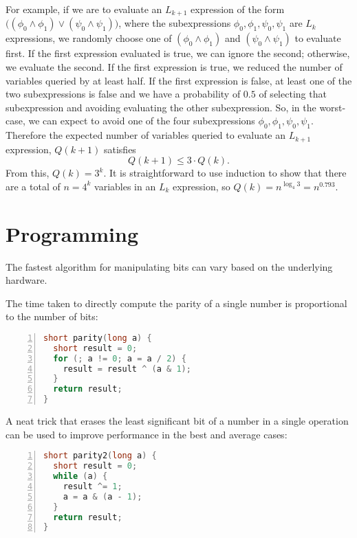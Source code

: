 For example, if we are to evaluate an $L_{k+1}$ expression of the form
$\big((\phi_0 \wedge \phi_1) \vee (\psi_0 \wedge \psi_1)\big)$,
where the subexpressions $\phi_0,\phi_1,\psi_0,\psi_1$ are $L_k$ expressions, we
randomly choose one of $(\phi_0\wedge\phi_1)$ and $(\psi_0 \wedge \psi_1)$ 
to evaluate first.  If the first expression evaluated is true, we can ignore the
second; otherwise, we evaluate the second. 
If the first expression is true, we reduced the number of variables queried
by at least half. If the first expression is false, at least
one of the two subexpressions is false and we have a probability of $0.5$
of selecting that subexpression and avoiding evaluating the other subexpression.
So, in the worst-case, we can expect to avoid one of the four
subexpressions $\phi_0,\phi_1,\psi_0,\psi_1$. Therefore the expected 
number of variables queried to evaluate an $L_{k+1}$ expression, $Q(k+1)$ satisfies 
\[
Q(k+1) \leq 3 \cdot Q(k) .
\]
From this, $Q(k) = 3^k$. It is straightforward to use induction
to show that there are a total of $n = 4^k$ variables in an $L_k$ expression, so 
$Q(k) = n^{\log_4 3} = n^{0.793}$.



\chapter{ Programming}
\lstset{language=C++}

The fastest algorithm for manipulating bits can vary based on the underlying hardware. 

The time taken to directly compute the parity of a single number is proportional
to the number of bits:
\begin{lstlisting}[basicstyle=\footnotesize,numbers=left,breaklines=true,language=C++]
short parity(long a) {
  short result = 0;
  for (; a != 0; a = a / 2) {
    result = result ^ (a & 1);
  }
  return result;
}
\end{lstlisting}

A neat trick that erases the least significant bit of a number
in a single operation can be used to improve performance in the
best and average cases:
\begin{lstlisting}[basicstyle=\footnotesize,numbers=left,breaklines=true,language=C++]
short parity2(long a) {
  short result = 0;
  while (a) {
    result ^= 1;
    a = a & (a - 1);
  }
  return result;
}
\end{lstlisting}

